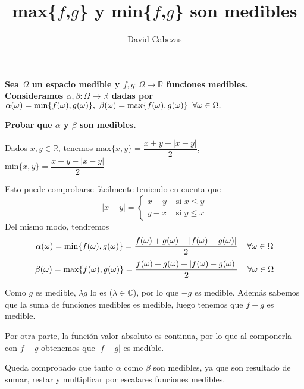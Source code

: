 \documentclass{article}
\begin{document}
\title{\Large max\{$f$,$g$\} y min\{$f$,$g$\} son medibles}
\author{David Cabezas}
\date{}
\maketitle

\begin{flushleft}
  \textbf{Sea $\Omega$ un espacio medible y
    $f,g:\Omega \longrightarrow \mathbb{R}$ funciones
    medibles. Consideramos
    $\alpha,\beta:\Omega \longrightarrow \mathbb{R}$ dadas por}
  $\alpha(\omega) = \mbox{min}\{f(\omega),g(\omega)\}, \ \beta(\omega)
  = \mbox{max}\{f(\omega),g(\omega)\} \hspace{2mm} \forall \omega \in
  \Omega.$

  \textbf{Probar que $\alpha$ y $\beta$ son medibles.}
\end{flushleft}  

\begin{flushleft}
  Dados $x,y \in \mathbb{R}$, tenemos
  $\mbox{max}\{x,y\}=\dfrac{x+y+|x-y|}{2}$, \
  $\mbox{min}\{x,y\}=\dfrac{x+y-|x-y|}{2}$

  Esto puede comprobarse fácilmente teniendo en cuenta que
  \[|x-y| =
\begin{cases}
x-y & \mbox{ si } x \leq y \\
y-x & \mbox{ si } y \leq x
\end{cases}
\]
Del mismo modo, tendremos
\[
  \alpha(\omega)=\mbox{min}\{f(\omega),g(\omega)\}=\dfrac{f(\omega)+g(\omega)-|f(\omega)-g(\omega)|}{2} \hspace{4mm} \forall \omega \in \Omega
\]
\[
  \beta(\omega)=\mbox{max}\{f(\omega),g(\omega)\}=\dfrac{f(\omega)+g(\omega)+|f(\omega)-g(\omega)|}{2} \hspace{4mm} \forall \omega \in \Omega
\]

Como $g$ es medible, $\lambda g$ lo es ($\lambda \in \mathbb{C}$), por
lo que $-g$ es medible. Además sabemos que la suma de funciones
medibles es medible, luego tenemos que $f-g$ es medible.

Por otra parte, la función valor absoluto es continua, por lo que al
componerla con $f-g$ obtenemos que $|f-g|$ es medible.

Queda comprobado que tanto $\alpha$ como $\beta$ son medibles, ya que
son resultado de sumar, restar y multiplicar por escalares funciones
medibles.

\hfill\qedsymbol
\end{flushleft}
\end{document}
